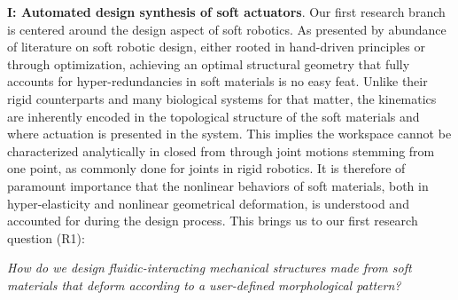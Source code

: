 \par \textbf{I: Automated design synthesis of soft actuators}. Our first research branch is centered around the design aspect of soft robotics. As presented by abundance of literature on soft robotic design, either rooted in hand-driven principles or through optimization, achieving an optimal structural geometry that fully accounts for hyper-redundancies in soft materials is no easy feat. Unlike their rigid counterparts and many biological systems for that matter, the kinematics are inherently encoded in the topological structure of the soft materials and where actuation is presented in the system. This implies the workspace cannot be characterized analytically in closed from through joint motions stemming from one point, as commonly done for joints in rigid robotics.  It is therefore of paramount importance that the nonlinear behaviors of soft materials, both in hyper-elasticity and nonlinear geometrical deformation, is understood and accounted for during the design process. This brings us to our first research question (R1):
%
\begin{center}
\textit{
How do we design fluidic-interacting mechanical structures made from soft materials that deform according to a user-defined morphological pattern?
}
\end{center}
%

